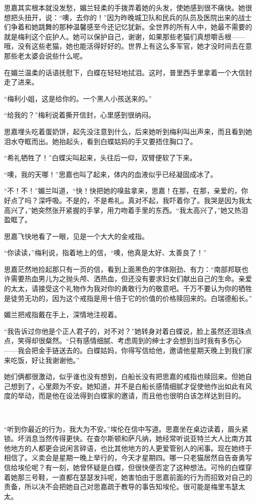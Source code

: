 \par 思嘉其实根本就没发愁，媚兰轻柔的手拨弄着她的头发，使她感到很不痛快。她很想把头扭开，说：“噢，去你的！”因为昨晚城卫队和民兵的队员及医院出来的战士们争着和她跳舞的那种温馨感至今还记忆犹新。全世界的所有人中，她最不需要的就是梅利这个庇护人。她可以保护自己，谢谢，如果那些老猫们真想嚼舌根——哦，没有这些老猫，她也能活得好好的。世界上有这么多军官，她才没时间去在意那些老太婆会说些什么呢。
\par 在媚兰温柔的话语抚慰下，白蝶在轻轻地拭泪。这时，普里西手里拿着一个大信封走了进来。
\par “梅利小姐，这是给你的。一个黑人小孩送来的。”
\par “给我的？”梅利说着撕开信封，心里感到很纳闷。
\par 思嘉埋头吃着蛋奶饼，起先没注意到什么，后来她听到梅利叫出声来，而且看到她泪水夺眶而出。她抬起头，看到白蝶姑妈的手又要捂住胸口了。
\par “希礼牺牲了！”白蝶尖叫起来，头往后一仰，双臂便软了下来。
\par “噢，我的天哪！”思嘉也叫了起来，体内的血液似乎已经凝固成冰了。
\par “不！不！”媚兰叫道，“快！快把她的嗅盐拿来，思嘉！在那，在那，亲爱的，你好点了吗？深呼吸。不是的，不是希礼。真对不起，我吓着你了。我哭是因为我太高兴了，”她突然张开紧握的手掌，用力吻着手里的东西。“我太高兴了，”她又热泪盈眶了。
\par 思嘉飞快地看了一眼，见是一个大大的金戒指。
\par “你读读，”梅利说，指着地上的信，“噢，他真是太好、太善良了！”
\par 思嘉茫然地捡起那只有一页的信，看到上面黑色的字体刚劲、有力：“南部邦联也许需要热血男儿为之抛头颅、洒热血，但还没有要求妇女们献出自己的生命。亲爱的太太，请接受这个礼物作为我对你的勇敢行为的敬意吧。千万不要认为你的牺牲是徒劳无功的，因为这个戒指是用十倍于它的价值的价格赎回来的。白瑞德船长。”
\par 媚兰把戒指戴在手上，深情地注视着。
\par “我告诉过你他是个正人君子的，对不对？”她转身对着白蝶说，脸上虽然还泪珠点点，笑得却很粲然。“只有感情细腻、考虑周到的绅士才会想到当时我有多伤心——我会把金手链送去的。白蝶姑妈，你得写信给他，邀请他星期天晚上到我们家来吃饭，好让我谢谢他。”
\par 她们俩都很激动，似乎谁也没有想到，白船长没有把思嘉的戒指也赎回来。但她自己想到了，心里颇为不安。她知道，并不是白船长感情细腻才促使他作出如此有风度的举动，而是他在设法得到白蝶家的邀请，而且他也很明白该怎样达到目的。
\par  
\par “听到你最近的行为，我大为不安。”埃伦在信中写道。思嘉坐在桌边读着，眉头紧锁。坏消息当然传得更快。在查尔斯顿和萨凡纳，她经常听说亚特兰大人比南方其他地方的人都更会说闲言碎语，也比其他地方的人更爱管别人的闲事。现在她终于相信了。义卖会是星期一晚上举行的，今天才星期四。哪一只老猫居然自告奋勇写信给埃伦呢？有一刻，她曾怀疑是白蝶，但很快便否定了这种想法。可怜的白蝶穿着她那三号鞋，一直都在瑟瑟发抖呢，她害怕由于思嘉前面的行为而招致对自己的责备，所以决不会把她自己对思嘉疏于教导的事告知埃伦。很可能是梅里韦瑟太太。
